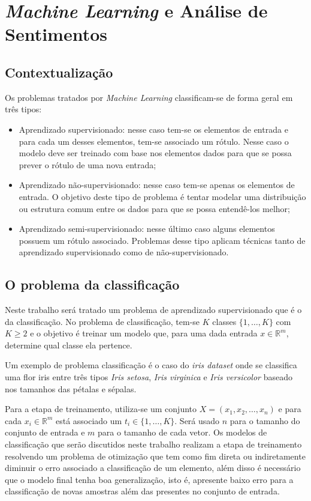 \chapter{\textit{Machine Learning} e Análise de Sentimentos}

\section{Contextualização}
\label{sec:methods}

Os problemas tratados por \textit{Machine Learning} classificam-se de forma
geral em três tipos:

\begin{itemize}
	\item Aprendizado supervisionado: nesse caso tem-se os elementos de entrada e
	para cada um desses elementos, tem-se associado um rótulo. Nesse caso o modelo
	deve ser treinado com base nos elementos dados para que se possa prever o rótulo %
	de uma nova entrada;
	\item Aprendizado não-supervisionado: nesse caso tem-se apenas os elementos de entrada. 
	O objetivo deste tipo de problema é tentar modelar uma distribuição ou estrutura comum
	entre os dados para que se possa entendê-los melhor;
	\item Aprendizado semi-supervisionado: nesse último caso alguns elementos possuem um rótulo
	associado. Problemas desse tipo aplicam técnicas tanto de aprendizado supervisionado como
	de não-supervisionado.
\end{itemize}

\section{O problema da classificação}

Neste trabalho será tratado um problema de aprendizado supervisionado que é o da classificação.
No problema de classificação, tem-se $K$ classes $\{1, \ldots, K\}$ com $K \ge 2$ e o objetivo
é treinar um modelo que, para uma dada entrada $x \in \mathbb{R}^m$, determine qual classe ela
pertence.

Um exemplo de problema classificação é o caso do \textit{iris dataset} onde se classifica uma
flor iris entre três tipos \textit{Iris setosa}, \textit{Iris virginica} e \textit{Iris versicolor}
baseado nos tamanhos das pétalas e sépalas.

Para a etapa de treinamento, utiliza-se um conjunto $X = (x_1, x_2, \ldots, x_n)$ e para cada
$x_i \in \mathbb{R}^m$ está associado um $t_i \in \{1, \ldots, K\}$. Será usado $n$ para o
tamanho do conjunto de entrada e $m$ para o tamanho de cada vetor.
Os modelos de classificação que serão discutidos neste trabalho realizam a etapa de treinamento
resolvendo um problema de otimização que tem como fim direta ou indiretamente diminuir o erro
associado a classificação de um elemento, além disso é necessário que o modelo final tenha
boa generalização, isto é, apresente baixo erro para a classificação de novas amostras além das
presentes no conjunto de entrada.


